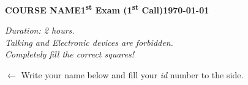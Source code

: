 \documentclass[a4paper]{article}
\newcommand{\ExamTitle}{\textbf{COURSE NAME\hfill 1\textsuperscript{st} Exam (1\textsuperscript{st} Call)}}
\newcommand{\ExamDate}{\today}
\begin{document}


\begin{examcopy}[5]
	\noindent\ExamTitle\hfill\textbf{\ExamDate}
	\begin{center}
		\emph{Duration: 2 hours.}\\
		\emph{Talking and Electronic devices are forbidden.}\\
		\emph{Completely fill the correct squares!}
	\end{center}
	{\setlength{\parindent}{0pt}\hspace*{\fill}\hspace*{\fill}
	\begin{minipage}[b]{6.5cm}
		\(\longleftarrow{}\)\hspace{1cm} Write your name below and fill your \emph{id} number to the side.

		\vspace{3ex}

		\hfill{}\hfill\vspace{5ex}\end{minipage}\hspace*{\fill}

	}
	\vspace*{0.5cm}
	\AMCcleardoublepage%
\end{examcopy}
\end{document}
